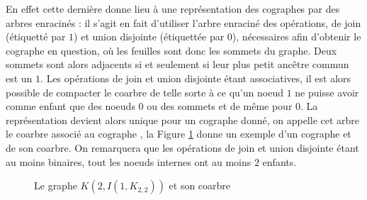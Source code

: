 \documentclass{scrartcl}
\begin{document}
\begin{flushleft}
En effet cette dernière donne lieu à une représentation des cographes par des arbres enracinés : il s'agit en fait d'utiliser l'arbre
enraciné des opérations, de join (étiquetté par $1$) et union disjointe (étiquettée par $0$), nécessaires afin d'obtenir le cographe en question,
où les feuilles sont donc les sommets du graphe. Deux sommets sont alors adjacents si et seulement si leur plus petit ancêtre commun est un $1$.
Les opérations de join et union disjointe étant associatives, il est alors possible de compacter le coarbre de telle sorte à ce qu'un noeud
$1$ ne puisse avoir comme enfant que des noeuds $0$ ou des sommets et de même pour $0$. La représentation devient alors unique pour un cographe
donné, on appelle cet arbre le coarbre associé au cographe \cite{cotrees}, la Figure \ref{excographe} donne un exemple d'un cographe et de
son coarbre. On remarquera que les opérations de join et union disjointe étant au moins binaires, tout les noeuds internes ont au moins
$2$ enfants. 

\begin{figure}[h]
    \caption{Le graphe $K(2,I(1,K_{2,2}))$ et son coarbre}\label{excographe}
    \vspace*{0.5cm}
    \begin{center}
\end{center}
\end{figure}
\end{flushleft}
\end{document}
